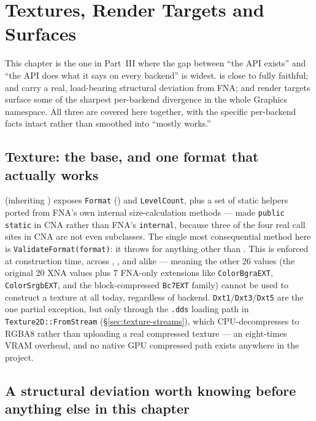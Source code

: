 \chapter{Textures, Render Targets and Surfaces}
\label{ch:textures-rendertargets}

This chapter is the one in Part~III where the gap between ``the API exists'' and ``the API
does what it says on every backend'' is widest.  is close to fully
faithful;  and  carry a real, load-bearing
structural deviation from FNA; and render targets surface some of the sharpest per-backend
divergence in the whole Graphics namespace. All three are covered here together, with the
specific per-backend facts intact rather than smoothed into ``mostly works.''

\section{Texture: the base, and one format that actually works}

 (inheriting ) exposes \texttt{Format}
() and \texttt{LevelCount}, plus a set of static helpers ported from
FNA's own internal size-calculation methods --- made \texttt{public static} in CNA rather
than FNA's \texttt{internal}, because three of the four real call sites in CNA are not even
 subclasses. The single most consequential method here is
\texttt{ValidateFormat(format)}: it throws for anything other than
. This is enforced at construction time, across
, , and  alike --- meaning the
other 26  values (the original 20 XNA values plus 7 FNA-only
extensions like \texttt{ColorBgraEXT}, \texttt{ColorSrgbEXT}, and the block-compressed
\texttt{Bc7EXT} family) cannot be used to construct a texture at all today, regardless of
backend. \texttt{Dxt1}/\texttt{Dxt3}/\texttt{Dxt5} are the one partial exception, but only
through the \texttt{.dds} loading path in \texttt{Texture2D::FromStream}
(\S\ref{sec:texture-streams}), which CPU-decompresses to RGBA8 rather than uploading a real
compressed texture --- an eight-times VRAM overhead, and no native GPU compressed path exists
anywhere in the project.

\section{A structural deviation worth knowing before anything else in this chapter}

